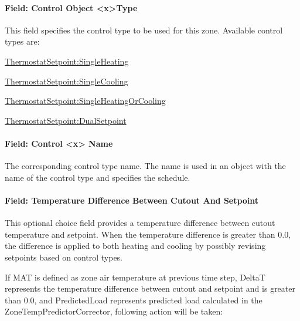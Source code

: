 \paragraph{Field: Control Object \textless{}x\textgreater{}Type}\label{field-control-object-xtype}

This field specifies the control type to be used for this zone. Available control types are:

\hyperref[thermostatsetpointsingleheating]{ThermostatSetpoint:SingleHeating}

\hyperref[thermostatsetpointsinglecooling]{ThermostatSetpoint:SingleCooling}

\hyperref[thermostatsetpointsingleheatingorcooling]{ThermostatSetpoint:SingleHeatingOrCooling}

\hyperref[thermostatsetpointdualsetpoint]{ThermostatSetpoint:DualSetpoint}

\paragraph{Field: Control \textless{}x\textgreater{} Name}\label{field-control-x-name}

The corresponding control type name. The name is used in an object with the name of the control type and specifies the schedule.

\paragraph{Field: Temperature Difference Between Cutout And Setpoint}\label{field-temperature-difference-between-cutout-and-Setpoint}

This optional choice field provides a temperature difference between cutout temperature and setpoint. When the temperature difference is greater than 0.0, the difference is applied to both heating and cooling by possibly revising setpoints based on control types.

If MAT is defined as zone air temperature at previous time step, DeltaT represents the temperature difference between cutout and setpoint and is greater than 0.0, and PredictedLoad represents predicted load calculated in the ZoneTempPredictorCorrector, following action will be taken:

